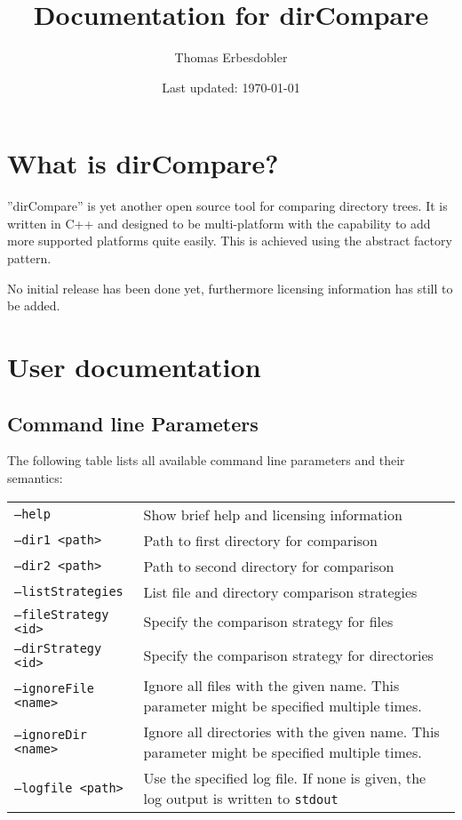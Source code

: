 \documentclass[a4paper]{article}
\title{Documentation for dirCompare}
\author{Thomas Erbesdobler}
\date{Last updated: \today}
\begin{document}
	\maketitle
	\tableofcontents
	
	\section{What is dirCompare?}
	\label{sec:what_is_dircompare}
	
	''dirCompare'' is yet another open source tool for comparing directory trees. It is written in C++ and designed to be multi-platform with the capability to add more supported platforms quite easily. This is achieved using the abstract factory pattern.
	
	\noindent
	No initial release has been done yet, furthermore licensing information has still to be added.
	
	\section{User documentation}
	\label{sec:user_documentation}
	
	\subsection{Command line Parameters}
	\label{subsec:command_line_parameters}
	
	The following table lists all available command line parameters and their semantics:
	
	\noindent
	\begin{tabularx}{\linewidth}{l|X}
		\texttt{--help} & Show brief help and licensing information \\
		\texttt{--dir1 \textless path\textgreater} & Path to first directory for comparison \\
		\texttt{--dir2 \textless path\textgreater} & Path to second directory for comparison \\
		\texttt{--listStrategies} & List file and directory comparison strategies \\
		\texttt{--fileStrategy \textless id\textgreater} & Specify the comparison strategy for files \\
		\texttt{--dirStrategy \textless id\textgreater} & Specify the comparison strategy for directories \\
		\texttt{--ignoreFile \textless name\textgreater} & Ignore all files with the given name. This parameter might be specified multiple times. \\
		\texttt{--ignoreDir \textless name\textgreater} & Ignore all directories with the given name. This parameter might be specified multiple times. \\
		\texttt{--logfile \textless path\textgreater} & Use the specified log file. If none is given, the log output is written to \texttt{stdout} \\
	\end{tabularx}
	
\end{document}
